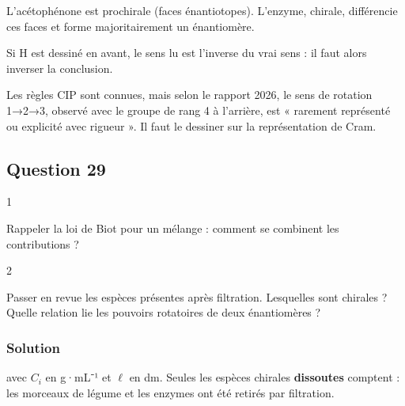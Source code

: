 \documentclass[11pt,a4paper]{article}
\newcommand{\equationajustee}[1]{%
  \sbox{\boiteequation}{$\displaystyle #1$}%
  \ifdim\wd\boiteequation>\linewidth
    \[\resizebox{\linewidth}{!}{\usebox{\boiteequation}}\]%
  \else
    \[#1\]%
  \fi}
\begin{document}
\equationajustee{\boxed{\text{(S)-1-\text{phényléthanol}}}}

L'acétophénone est prochirale (faces énantiotopes). L'enzyme, chirale, différencie ces faces et forme majoritairement un énantiomère.

\begin{piege}

Si H est dessiné en avant, le sens lu est l'inverse du vrai sens : il faut alors inverser la conclusion.

\end{piege}

\begin{jury}

Les règles CIP sont connues, mais selon le rapport 2026, le sens de rotation 1→2→3, observé avec le groupe de rang 4 à l'arrière, est « rarement représenté ou explicité avec rigueur ». Il faut le dessiner sur la représentation de Cram.

\end{jury}

\hypertarget{question-29}{%
\subsection{Question 29}\label{question-29}}

\begin{indication}{1}

Rappeler la loi de Biot pour un mélange : comment se combinent les contributions ?

\end{indication}

\begin{indication}{2}

Passer en revue les espèces présentes après filtration. Lesquelles sont chirales ? Quelle relation lie les pouvoirs rotatoires de deux énantiomères ?

\end{indication}

\hypertarget{solution-28}{%
\subsubsection{Solution}\label{solution-28}}

\equationajustee{\boxed{\alpha = \ell\sum_i[\alpha]_iC_i}}

avec \(C_i\) en g·mL⁻¹ et \(\ell\) en dm. Seules les espèces chirales \textbf{dissoutes} comptent : les morceaux de légume et les enzymes ont été retirés par filtration.
\end{document}
